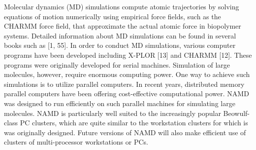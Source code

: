 Molecular dynamics (MD) simulations compute atomic trajectories by solving equations of motion numerically using empirical force fields, such as the CHARMM force field, that approximate the actual atomic force in biopolymer systems. Detailed information about MD simulations can be found in several books such as [1, 55]. In order to conduct MD simulations, various computer programs have been developed including X-PLOR [13] and CHARMM [12]. These programs were originally developed for serial machines. Simulation of large molecules, however, require enormous computing power. One way to achieve such simulations is to utilize parallel computers. In recent years, distributed memory parallel computers have been offering cost-effective computational power. NAMD was designed to run efficiently on such parallel machines for simulating large molecules. NAMD is particularly well suited to the increasingly popular Beowulf-class PC clusters, which are quite similar to the workstation clusters for which is was originally designed. Future versions of NAMD will also make efficient use of clusters of multi-processor workstations or PCs.


